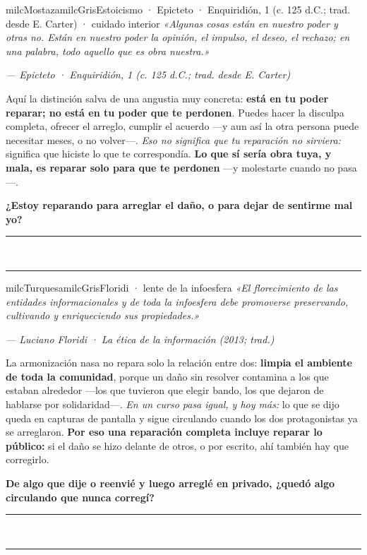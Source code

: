 \documentclass[11pt,letterpaper]{article}
\newcommand{\linead}[1]{\noindent\color{milcLinea}\rule{#1}{0.5pt}\color{milcNegro}}
\begin{document}
\begin{softbox}{milcMostaza}{milcGris}{Estoicismo · Epicteto · Enquiridión, 1 (c. 125 d.C.; trad. desde E. Carter) · cuidado interior}
\textit{«Algunas cosas están en nuestro poder y otras no. Están en nuestro poder la opinión, el impulso, el deseo, el rechazo; en una palabra, todo aquello que es obra nuestra.»}

{\footnotesize\itshape\color{milcNegro!70}--- Epicteto · Enquiridión, 1 (c. 125 d.C.; trad. desde E. Carter)}

Aquí la distinción salva de una angustia muy concreta: \textbf{está en tu poder reparar; no está en tu poder que te perdonen}. Puedes hacer la disculpa completa, ofrecer el arreglo, cumplir el acuerdo ---y aun así la otra persona puede necesitar meses, o no volver---. \emph{Eso no significa que tu reparación no sirviera:} significa que hiciste lo que te correspondía. \textbf{Lo que sí sería obra tuya, y mala, es reparar solo para que te perdonen} ---y molestarte cuando no pasa---.

\textbf{¿Estoy reparando para arreglar el daño, o para dejar de sentirme mal yo?}
\end{softbox}
\linead{\linewidth}\\[1mm]
\linead{\linewidth}

\begin{softbox}{milcTurquesa}{milcGris}{Floridi · lente de la infoesfera}
\textit{«El florecimiento de las entidades informacionales y de toda la infoesfera debe promoverse preservando, cultivando y enriqueciendo sus propiedades.»}

{\footnotesize\itshape\color{milcNegro!70}--- Luciano Floridi · La ética de la información (2013; trad.)}

La armonización nasa no repara solo la relación entre dos: \textbf{limpia el ambiente de toda la comunidad}, porque un daño sin resolver contamina a los que estaban alrededor ---los que tuvieron que elegir bando, los que dejaron de hablarse por solidaridad---. \emph{En un curso pasa igual, y hoy más:} lo que se dijo queda en capturas de pantalla y sigue circulando cuando los dos protagonistas ya se arreglaron. \textbf{Por eso una reparación completa incluye reparar lo público:} si el daño se hizo delante de otros, o por escrito, ahí también hay que corregirlo.

\textbf{De algo que dije o reenvié y luego arreglé en privado, ¿quedó algo circulando que nunca corregí?}
\end{softbox}
\linead{\linewidth}\\[1mm]
\linead{\linewidth}
\end{document}
